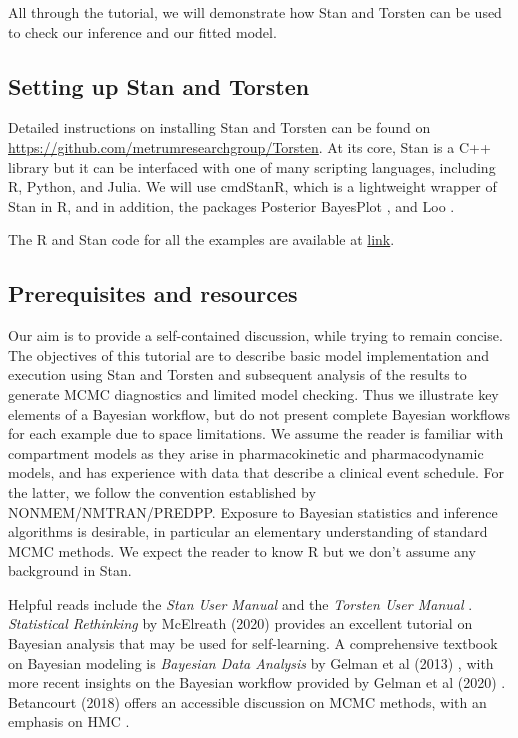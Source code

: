 All through the tutorial, we will demonstrate how Stan and Torsten can be used to check our inference and our fitted model.

\subsection{Setting up Stan and Torsten}

Detailed instructions on installing Stan and Torsten can be found on \url{https://github.com/metrumresearchgroup/Torsten}.
At its core, Stan is a C++ library but it can be interfaced with one of many scripting languages, including R, Python, and Julia.
We will use cmdStanR, which is a lightweight wrapper of Stan in R, and
in addition, the packages Posterior \cite{Bukner:2020} BayesPlot \cite{Gabry:2021}, and Loo \cite{Gabry:2020}.

The R and Stan code for all the examples are available at \url{link}.

 \subsection{Prerequisites and resources}
 
 Our aim is to provide a self-contained discussion, while trying to remain concise. 
The objectives of this tutorial are to describe basic model implementation and execution using Stan and Torsten and subsequent analysis of the results to generate MCMC diagnostics and limited model checking. Thus we illustrate key elements of a Bayesian workflow, but do not present complete Bayesian workflows for each example due to space limitations.
 We assume the reader is familiar with compartment models as they arise in pharmacokinetic and pharmacodynamic models, and has experience with data that describe a clinical event schedule.
 For the latter, we follow the convention established by NONMEM/NMTRAN/PREDPP.
 Exposure to Bayesian statistics and inference algorithms is desirable, in particular an elementary understanding of standard MCMC methods.
 We expect the reader to know R but we don't assume any background in Stan.
 
 Helpful reads include the \textit{Stan User Manual} \cite{Stan:2021} and the \textit{Torsten User Manual} \cite{Torsten:2021}. 
\textit{Statistical Rethinking} by McElreath (2020)\cite{mcelreath2020statistical} provides an excellent tutorial on Bayesian analysis that may be used for self-learning.
 A comprehensive textbook on Bayesian modeling is \textit{Bayesian Data Analysis} by Gelman et al (2013) \cite{Gelman:2013b}, with more recent insights on the Bayesian workflow provided by Gelman et al (2020) \cite{Gelman:2020}. 
 Betancourt (2018) offers an accessible discussion on MCMC methods, with an emphasis on HMC \cite{Betancourt:2018}.
   
 
 